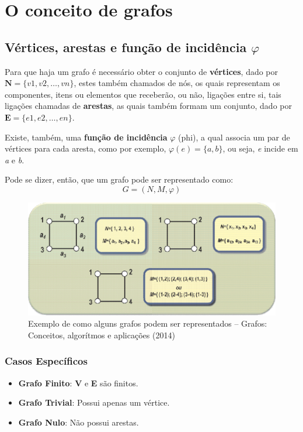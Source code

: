 \documentclass[a4paper, 12pt]{article}
\begin{document}
\section{O conceito de grafos}
\subsection{Vértices, arestas e função de incidência {$\varphi$}}
Para que haja um grafo é necessário obter o conjunto de \textbf{vértices}, dado por $\textbf{N} = \{v1, v2, \ldots, vn\}$, estes também chamados de nós, os quais representam os componentes, itens ou elementos que receberão, ou não, ligações entre si, tais ligações chamadas de \textbf{arestas}, as quais também formam um conjunto, dado por $\textbf{E} = \{e1, e2, \ldots, en\}$.

Existe, também, uma \textbf{função de incidência} $ \varphi $ (phi), a qual associa um par de vértices para cada aresta, como por exemplo, $ \varphi(e) = \{ a, b \}$, ou seja, \textit{e} incide em \textit{a} e \textit{b}.

Pode se dizer, então, que um grafo pode ser representado como: \[ G = (N, M, \varphi) \]

	\begin{figure}[hbt]
		\centering
		\includegraphics[width=\linewidth]{exemplo.png}

		\caption{Exemplo de como alguns grafos podem ser representados -- Grafos: Conceitos, algorítmos e aplicações (2014) }
	\end{figure}


\subsubsection{Casos Específicos}

\begin{itemize}
	\item\textbf{Grafo Finito}:  \textbf{V} e \textbf{E} são finitos.
	\item\textbf{Grafo Trivial}: Possui apenas um vértice.
	\item\textbf{Grafo Nulo}: Não possui arestas.
\end{itemize}
\end{document}
